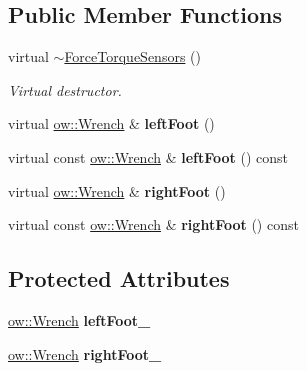 \subsection*{Public Member Functions}
\begin{DoxyCompactItemize}
\item 
virtual \hyperlink{classow__core_1_1ForceTorqueSensors_a9872e14ea1b6b503f4eef0f17222eb57}{$\sim$\+Force\+Torque\+Sensors} ()\hypertarget{classow__core_1_1ForceTorqueSensors_a9872e14ea1b6b503f4eef0f17222eb57}{}\label{classow__core_1_1ForceTorqueSensors_a9872e14ea1b6b503f4eef0f17222eb57}

\begin{DoxyCompactList}\small\item\em Virtual destructor. \end{DoxyCompactList}\item 
virtual \hyperlink{classow__core_1_1Wrench}{ow\+::\+Wrench} \& {\bfseries left\+Foot} ()\hypertarget{classow__core_1_1ForceTorqueSensors_a45ed561bd8b97569e16b9ef5ae46a073}{}\label{classow__core_1_1ForceTorqueSensors_a45ed561bd8b97569e16b9ef5ae46a073}

\item 
virtual const \hyperlink{classow__core_1_1Wrench}{ow\+::\+Wrench} \& {\bfseries left\+Foot} () const \hypertarget{classow__core_1_1ForceTorqueSensors_a7fed26b5f54f39730d0eca7145585d3e}{}\label{classow__core_1_1ForceTorqueSensors_a7fed26b5f54f39730d0eca7145585d3e}

\item 
virtual \hyperlink{classow__core_1_1Wrench}{ow\+::\+Wrench} \& {\bfseries right\+Foot} ()\hypertarget{classow__core_1_1ForceTorqueSensors_a7093ca53c0ab93e2ad274e8bf03313bf}{}\label{classow__core_1_1ForceTorqueSensors_a7093ca53c0ab93e2ad274e8bf03313bf}

\item 
virtual const \hyperlink{classow__core_1_1Wrench}{ow\+::\+Wrench} \& {\bfseries right\+Foot} () const \hypertarget{classow__core_1_1ForceTorqueSensors_aad0539d24a54f5cb111cbdbaf6ff4f35}{}\label{classow__core_1_1ForceTorqueSensors_aad0539d24a54f5cb111cbdbaf6ff4f35}

\end{DoxyCompactItemize}
\subsection*{Protected Attributes}
\begin{DoxyCompactItemize}
\item 
\hyperlink{classow__core_1_1Wrench}{ow\+::\+Wrench} {\bfseries left\+Foot\+\_\+}\hypertarget{classow__core_1_1ForceTorqueSensors_a89fd5dd2e34a98cc2e2902e357ec9432}{}\label{classow__core_1_1ForceTorqueSensors_a89fd5dd2e34a98cc2e2902e357ec9432}

\item 
\hyperlink{classow__core_1_1Wrench}{ow\+::\+Wrench} {\bfseries right\+Foot\+\_\+}\hypertarget{classow__core_1_1ForceTorqueSensors_a9cb8c802cfc5bd1e110abf12a101b2af}{}\label{classow__core_1_1ForceTorqueSensors_a9cb8c802cfc5bd1e110abf12a101b2af}

\end{DoxyCompactItemize}


